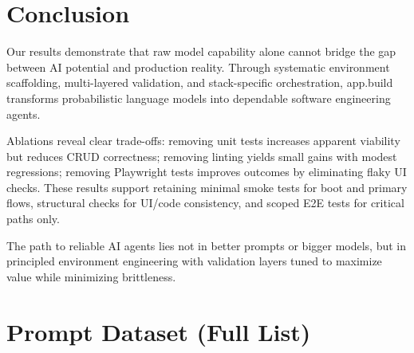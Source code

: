 \documentclass[11pt]{article}
\begin{document}
\section{Conclusion}
\label{sec:conclusion}

Our results demonstrate that raw model capability alone cannot bridge the gap between AI potential and production reality. Through systematic environment scaffolding, multi-layered validation, and stack-specific orchestration, app.build transforms probabilistic language models into dependable software engineering agents.

Ablations reveal clear trade-offs: removing unit tests increases apparent viability but reduces CRUD correctness; removing linting yields small gains with modest regressions; removing Playwright tests improves outcomes by eliminating flaky UI checks. These results support retaining minimal smoke tests for boot and primary flows, structural checks for UI/code consistency, and scoped E2E tests for critical paths only.

The path to reliable AI agents lies not in better prompts or bigger models, but in principled environment engineering with validation layers tuned to maximize value while minimizing brittleness.




\appendix

\section{Prompt Dataset (Full List)}
\label{sec:prompt-dataset}
\end{document}
